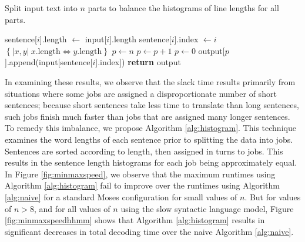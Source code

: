 \documentclass{pbml}
\begin{document}
\begin{algorithm}[!h]
\caption{Split input text into $n$ parts to balance the histograms of line lengths for all parts.}
\begin{algorithmic}
\State sentence[$i$].length $\gets$ input[$i$].length
\State sentence[$i$].index $\gets i$
\EndFor
\State {} $\left\{|x,y|\ x.\mbox{length}\Leftrightarrow y.\mbox{length}\right\}$ 
\State {}
\State $p \gets n$
\State $p \gets p+1$
\Else
\State $p \gets 0$
\EndIf
\State output[$p$].append(input[sentence[$i$].index])
\EndFor
\State \textbf{return} output
\EndFunction
\end{algorithmic}
\label{alg:histogram}
\end{algorithm}

In examining these results, we observe that the slack time results primarily from situations where some jobs are assigned a disproportionate number of short sentences; because short sentences take less time to translate than long sentences, such jobs finish much faster than jobs that are assigned many longer sentences. To remedy this imbalance, we propose Algorithm \ref{alg:histogram}. This technique examines the word lengths of each sentence prior to splitting the data into jobs. Sentences are sorted according to length, then assigned in turns to jobs. This results in the sentence length histograms for each job being approximately equal. 
%
%
%
%
%
%
In Figure \ref{fig:minmaxspeed}, we observe that the maximum runtimes using Algorithm \ref{alg:histogram} fail to improve over the runtimes using Algorithm \ref{alg:naive} for a standard Moses configuration for small values of $n$. But for values of $n>8$, and for all values of $n$ using the slow syntactic language model, Figure \ref{fig:minmaxspeedhhmm} shows that Algorithm \ref{alg:histogram} results in significant decreases in total decoding time over the naive Algorithm \ref{alg:naive}.
\end{document}
